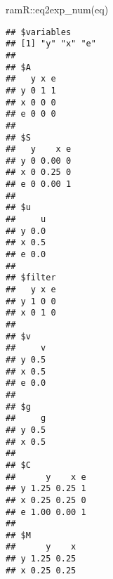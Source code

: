 \documentclass[
]{book}
\newenvironment{Shaded}{\begin{snugshade}}{\end{snugshade}}
\newcommand{\FunctionTok}[1]{\textcolor[rgb]{0.00,0.00,0.00}{#1}}
\newcommand{\NormalTok}[1]{#1}
\newcommand{\SpecialCharTok}[1]{\textcolor[rgb]{0.00,0.00,0.00}{#1}}
\theoremstyle{definition}
\theoremstyle{definition}
\theoremstyle{definition}
\theoremstyle{remark}
\begin{document}
\begin{Shaded}
\begin{Highlighting}[]
\NormalTok{ramR}\SpecialCharTok{::}\FunctionTok{eq2exp\_num}\NormalTok{(eq)}
\end{Highlighting}
\end{Shaded}

\begin{verbatim}
## $variables
## [1] "y" "x" "e"
## 
## $A
##   y x e
## y 0 1 1
## x 0 0 0
## e 0 0 0
## 
## $S
##   y    x e
## y 0 0.00 0
## x 0 0.25 0
## e 0 0.00 1
## 
## $u
##     u
## y 0.0
## x 0.5
## e 0.0
## 
## $filter
##   y x e
## y 1 0 0
## x 0 1 0
## 
## $v
##     v
## y 0.5
## x 0.5
## e 0.0
## 
## $g
##     g
## y 0.5
## x 0.5
## 
## $C
##      y    x e
## y 1.25 0.25 1
## x 0.25 0.25 0
## e 1.00 0.00 1
## 
## $M
##      y    x
## y 1.25 0.25
## x 0.25 0.25
\end{verbatim}

  
\end{document}
